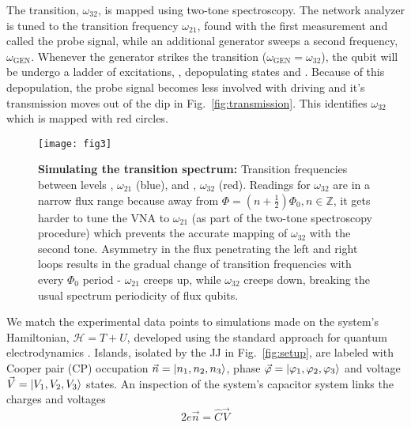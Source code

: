 The \ilra{}  transition, $\omega_{32}$, is  mapped using two-tone  spectroscopy.  The
network  analyzer is  tuned to  the transition  frequency  $ \omega_{21}  $, found  with the  first
measurement  and called  the  probe signal,  while  an additional  generator  sweeps a  second
frequency,  $  \omega_{\text{GEN}} $.   Whenever  the  generator strikes  the  \ira{}
transition ($\omega_{\text{GEN}} =  \omega_{32} $), the qubit  will be undergo a  ladder of excitations,
    , depopulating states 
and  .  Because  of this  depopulation, the  probe signal  becomes less  involved with
driving  and it's  transmission moves  out of  the dip  in Fig.~\ref{fig:transmission}.   This
identifies $\omega_{32}$ which is mapped with red circles.



\begin{figure}[h]
  \texttt{[image: fig3]}
  \caption{\small \textbf{Simulating the transition  spectrum:} Transition frequencies between
    levels  \ilra  {},   $  \omega_{21}  $  (blue),  and     \ilra  {},
    $ \omega_{32}$  (red).  Readings for $  \omega_{32} $ are in  a narrow flux range  because away from
    $  \Phi  =  (n +  \frac{1}{2})\Phi_0,  n\in\mathbb{Z}  $,  it  gets  harder  to tune  the  VNA  to
    $ \omega_{21} $  (as part of the  two-tone spectroscopy procedure) which  prevents the accurate
    mapping of $  \omega_{32} $ with the second  tone.  Asymmetry in the flux  penetrating the left
    and  right loops  results  in the  gradual  change of  transition  frequencies with  every
    $ \Phi_{0}  $ period -  $\omega_{21}$ creeps  up, while $\omega_{32}$  creeps down, breaking  the usual
    spectrum periodicity of flux qubits.}
  \label{fig:experiment}
\end{figure}

We  match the  experimental  data points  to  simulations made  on  the system's  Hamiltonian,
$ \mathcal{H}  = T + U  $, developed using  the standard approach for  quantum electrodynamics
\cite{orlando1999}.  Islands,  isolated by  the JJ in  Fig.~\ref{fig:setup}, are  labeled with
Cooper   pair    (CP)   occupation   $   \vec{n}    =   \Ket{n_1,   n_2,   n_3}    $,   phase
$       \vec{\varphi}       =       \Ket{\varphi_1,       \varphi_2,       \varphi_3}       $       and       voltage
$ \vec{V}  = \Ket{V_{1},  V_{2}, V_{3}} $  states.  An inspection  of the  system's capacitor
system links the charges and voltages
\begin{equation}
  \label{eq:link}
  2e\vec{n} = \hat{C}\vec{V}
\end{equation}

